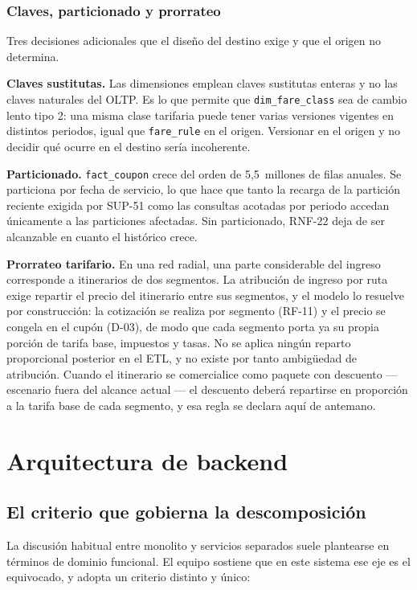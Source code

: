 \documentclass[10pt,letterpaper]{article}
\begin{document}
\subsubsection{Claves, particionado y prorrateo}
Tres decisiones adicionales que el diseño del destino exige y que el origen no determina.

\textbf{Claves sustitutas.} Las dimensiones emplean claves sustitutas enteras y no las claves naturales del OLTP. Es lo que permite que \texttt{dim\_fare\_class} sea de cambio lento tipo 2: una misma clase tarifaria puede tener varias versiones vigentes en distintos periodos, igual que \texttt{fare\_rule} en el origen. Versionar en el origen y no decidir qué ocurre en el destino sería incoherente.

\textbf{Particionado.} \texttt{fact\_coupon} crece del orden de 5{,}5~millones de filas anuales. Se particiona por fecha de servicio, lo que hace que tanto la recarga de la partición reciente exigida por SUP-51 como las consultas acotadas por periodo accedan únicamente a las particiones afectadas. Sin particionado, RNF-22 deja de ser alcanzable en cuanto el histórico crece.

\textbf{Prorrateo tarifario.} En una red radial, una parte considerable del ingreso corresponde a itinerarios de dos segmentos. La atribución de ingreso por ruta exige repartir el precio del itinerario entre sus segmentos, y el modelo lo resuelve por construcción: la cotización se realiza por segmento (RF-11) y el precio se congela en el cupón (D-03), de modo que cada segmento porta ya su propia porción de tarifa base, impuestos y tasas. No se aplica ningún reparto proporcional posterior en el ETL, y no existe por tanto ambigüedad de atribución. Cuando el itinerario se comercialice como paquete con descuento --- escenario fuera del alcance actual --- el descuento deberá repartirse en proporción a la tarifa base de cada segmento, y esa regla se declara aquí de antemano.

\section{Arquitectura de backend}
\label{sec:backend}

\subsection{El criterio que gobierna la descomposición}
La discusión habitual entre monolito y servicios separados suele plantearse en términos de dominio funcional. El equipo sostiene que en este sistema ese eje es el equivocado, y adopta un criterio distinto y único:
\end{document}

